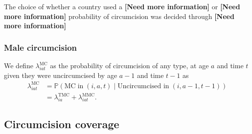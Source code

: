 \documentclass{article}
\begin{document}
\begin{appendix}
The choice of whether a country used a {\color{red}\bf[Need more information]} or {\color{red}\bf[Need more information]} probability of circumcision was decided through {\color{red}\bf[Need more information]}


\subsubsection*{Male circumcision}


\noindent We define $\lambda^{\text{MC}}_{iat}$ as the probability of circumcision of any type, at age $a$ and time $t$ given they were uncircumcised by age $a-1$ and time $t-1$ as
\begin{equation}
	\begin{split}
	\lambda^{\text{MC}}_{iat} &= \mathbb{P}(\text{MC} \; \text{in} \; (i,a,t) \; | \; \text{Uncircumcised in} \; (i,a-1,t-1)) \\ 
	              &= \lambda^{\text{TMC}}_{ia} + \lambda^{\text{MMC}}_{iat}. 
	\end{split}
	\label{eqn::tot}
\end{equation}


\subsection{Circumcision coverage}



\end{appendix}
\end{document}
